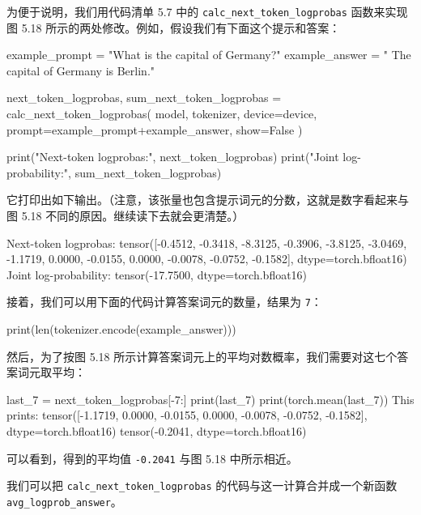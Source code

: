 
为便于说明，我们用代码清单 5.7 中的 \texttt{calc\_next\_token\_logprobas} 函数来实现图 5.18 所示的两处修改。例如，假设我们有下面这个提示和答案：

\begin{codebox}
example_prompt = "What is the capital of Germany?"
example_answer = " The capital of Germany is Berlin."

next_token_logprobas, sum_next_token_logprobas = calc_next_token_logprobas(
        model, tokenizer, device=device,
        prompt=example_prompt+example_answer,
        show=False
    )

print("Next-token logprobas:", next_token_logprobas)
print("Joint log-probability:", sum_next_token_logprobas)
\end{codebox}

它打印出如下输出。（注意，该张量也包含提示词元的分数，这就是数字看起来与图 5.18 不同的原因。继续读下去就会更清楚。）

\begin{codebox}
Next-token logprobas: tensor([-0.4512, -0.3418, -8.3125, -0.3906,
-3.8125, -3.0469, -1.1719,  0.0000, -0.0155,  0.0000,
-0.0078, -0.0752, -0.1582], dtype=torch.bfloat16)
Joint log-probability: tensor(-17.7500, dtype=torch.bfloat16)
\end{codebox}

接着，我们可以用下面的代码计算答案词元的数量，结果为 \texttt{7}：

\begin{codebox}
print(len(tokenizer.encode(example_answer)))
\end{codebox}

然后，为了按图 5.18 所示计算答案词元上的平均对数概率，我们需要对这七个答案词元取平均：

\begin{codebox}
last_7 = next_token_logprobas[-7:]
print(last_7)
print(torch.mean(last_7))
This prints:
tensor([-1.1719,  0.0000, -0.0155,  0.0000, -0.0078, -0.0752, -0.1582],
       dtype=torch.bfloat16)
tensor(-0.2041, dtype=torch.bfloat16)
\end{codebox}

可以看到，得到的平均值 \texttt{-0.2041} 与图 5.18 中所示相近。

我们可以把 \texttt{calc\_next\_token\_logprobas} 的代码与这一计算合并成一个新函数 \texttt{avg\_logprob\_answer}。\texttt{}

